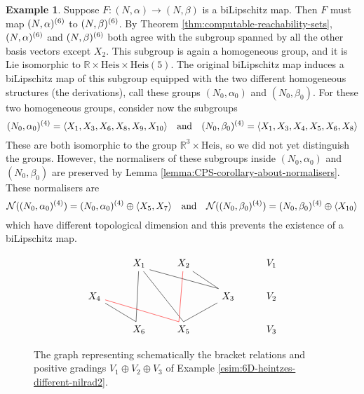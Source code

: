 \documentclass[a4paper,12pt]{amsart}
\newcommand{\pp}{\mathrm}
\DeclarePairedDelimiter\braket{\langle}{\rangle}
\theoremstyle{plain}
\theoremstyle{definition}
\newtheorem{Esim}[maar]{Example}
\theoremstyle{plain}
\theoremstyle{remark}
\begin{document}
\begin{Esim}
	Suppose \( F \colon (N,\alpha) \to (N,\beta) \) is a biLipschitz map. 
	Then \( F \) must map \( (N,\alpha)^{(6)} \) to \( (N,\beta)^{(6)} \).
	By Theorem \ref{thm:computable-reachability-sets}, \( (N,\alpha)^{(6)} \) and \( (N,\beta)^{(6)} \) both agree with the subgroup spanned by all the other basis vectors except \( X_2 \). This subgroup is again a homogeneous group, and it is Lie isomorphic to \( \mathbb{R} \times \pp{Heis} \times \pp{Heis}(5) \). The original biLipschitz map induces a biLipschitz map of this subgroup equipped with the two different homogeneous structures (the derivations), call these groups \( (N_0,\alpha_0) \) and \( (N_0,\beta_0) \).	
	For these two homogeneous groups, consider now the subgroups 
	\begin{equation*}
	\reach{N_0}{\alpha_0}{4}
	 =  \braket{X_1, X_3, X_6, X_8, X_9, X_{10}} \quad \text{and} \quad
\reach{N_0}{\beta_0}{4}
	 =  \braket{X_1, X_3, X_4, X_5, X_6, X_8}
	\end{equation*}
	These are both isomorphic to the group \( \mathbb{R}^3 \times \pp{Heis} \), so we did not yet distinguish the groups. However, the normalisers of these subgroups inside \( (N_0,\alpha_0) \) and \( (N_0,\beta_0) \) are preserved by Lemma \ref{lemma:CPS-corollary-about-normalisers}. These normalisers are
	\begin{equation*}
	\mathcal{N}(\reach{N_0}{\alpha_0}{4})  =  \reach{N_0}{\alpha_0}{4} \oplus \braket{X_5, X_7} \quad \text{and} \quad
	\mathcal{N}(\reach{N_0}{\beta_0}{4})  =  \reach{N_0}{\beta_0}{4} \oplus \braket{X_{10}}
	\end{equation*}
	which have different topological dimension and this prevents the existence of a \linebreak biLipschitz map.
\end{Esim}



\begin{figure}[h]
	\begin{equation*}
	\begin{tikzcd}
	& X_1 \arrow[dd, dash, end anchor=110] \arrow[drr, dash, end anchor=140, start anchor=330]
	\arrow[ddr, dash, end anchor=90, start anchor=300]
	& X_2 \arrow[dr, dash, end anchor=140, start anchor=320] 
	\arrow[dd, dash, end anchor=120, red]
	& & V_1
	\\
	X_4 \arrow[dr, dash, end anchor=110] \arrow[drr, dash, end anchor=120, red] &  & & X_3
	\arrow[dl, dash, end anchor=90, start anchor=210]  & V_2
	\\
	& X_6 & X_5 && V_3
	\end{tikzcd}
	\end{equation*}
	\caption{The graph representing schematically the bracket relations and positive gradings \(V_1 \oplus V_2 \oplus V_3\) of Example \ref{esim:6D-heintzes-different-nilrad2}.}
	\label{fig:bracket-relations2}
\end{figure}
\end{document}
